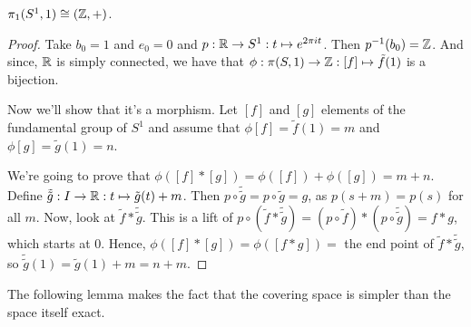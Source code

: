 

\begin{theorem}
    $\pi_1(S^{1}, 1) \cong (\mathbb{Z}, +)$.
\end{theorem}
\begin{proof}
    Take $b_0 = 1$ and $e_0=0$ and $p: \mathbb{R} \to S^{1}: t \mapsto e^{2 \pi i t}$.
    Then $p ^{-1}(b_0) = \mathbb{Z}$.
    And since, $\mathbb{R}$ is simply connected, we have that $\phi: \pi(S, 1) \to  \mathbb{Z}: [f] \mapsto  \tilde f(1)$ is a bijection.

    Now we'll show that it's a morphism.
    Let $[f]$ and $[g]$ elements of the fundamental group of $S^1$ and assume that $\phi[f] = \tilde f(1) = m$ and $\phi[g] = \tilde g(1) = n$.

    We're going to prove that $\phi([f]*[g]) = \phi([f]) + \phi([g]) = m + n$. 
    Define $\tilde{\tilde g}: I \to  \mathbb{R}: t \mapsto  \tilde g(t) + m$.
    Then $p \circ \tilde{\tilde g} = p  \circ  \tilde g = g$, as $p(s+m) = p(s)$ for all  $m$.
    Now, look at $\tilde f * \tilde{\tilde g}$.
    This is a lift of $p  \circ (\tilde f * \tilde{\tilde g}) = (p  \circ  \tilde f) * (p  \circ  \tilde{\tilde{g}}) = f*g$, which starts at $0$.
    Hence, $\phi([f]*[g]) = \phi([f*g]) = $ the end point of  $\tilde f * \tilde{\tilde g}$, so  $\tilde{\tilde{g}}(1) = \tilde g(1) + m = n + m$.
\end{proof}

The following lemma makes the fact that the covering space is simpler than the space itself exact.

